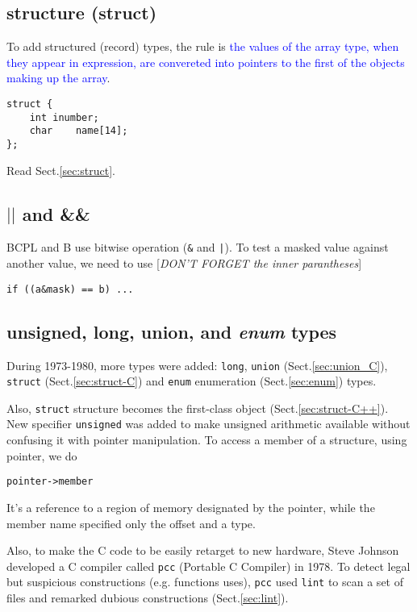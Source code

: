 \subsection{structure (struct)}

To add structured (record) types, the rule is \textcolor{blue}{the values of the
array type, when they appear in expression, are convereted into pointers to the
first of the objects making up the array}.
\begin{lstlisting}
struct {
	int	inumber;
	char	name[14];
};
\end{lstlisting}

Read Sect.\ref{sec:struct}.

\subsection{$||$ and \&\&}

BCPL and B use bitwise operation (\verb!&! and \verb!|!). To test a masked value
against another value, we need to use [{\it DON'T FORGET the inner parantheses}]
\begin{verbatim}
if ((a&mask) == b) ...
\end{verbatim}

\subsection{unsigned, long, union, and {\it enum} types}

During 1973-1980, more types were added: \verb!long!, \verb!union!
(Sect.\ref{sec:union_C}), \verb!struct! (Sect.\ref{sec:struct-C}) and
\verb!enum! enumeration (Sect.\ref{sec:enum}) types. 

Also, \verb!struct! structure becomes the first-class object
(Sect.\ref{sec:struct-C++}). New specifier \verb!unsigned! was added to make
unsigned arithmetic available without confusing it with pointer manipulation. To
access a member of a structure, using pointer, we do
\begin{verbatim}
pointer->member
\end{verbatim}
It's a reference to a region of memory designated by the pointer, while the
member name specified only the offset and a type.

Also, to make the C code to be easily retarget to new hardware, Steve Johnson
developed a C compiler called \verb!pcc! (Portable C Compiler) in 1978. To
detect legal but suspicious constructions (e.g. functions uses), \verb!pcc! used
\verb!lint! to scan a set of files and remarked dubious constructions
(Sect.\ref{sec:lint}).

